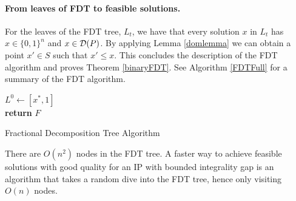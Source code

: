 	\paragraph{From leaves of FDT to feasible solutions.}
	For the leaves of the FDT tree,  $L_t$, we have that every solution $x$ in $L_t$ has $x\in\{0,1\}^n$ and $x\in \operatorname{\mathcal{D}}(P)$. By applying Lemma \ref{domlemma} we can obtain a point $x'\in S$ such that $x'\leq x$. This concludes the description of the FDT algorithm and proves Theorem \ref{binaryFDT}. See Algorithm \ref{FDTFull} for a summary of the FDT algorithm.
	
	\vspace*{8pt}
	
	
	\begin{algorithm}[H]\label{FDTFull}
		$L^0\leftarrow [x^*,1]$\\
		\textbf{return} $F$
		\caption{Fractional Decomposition Tree Algorithm}
	\end{algorithm}
	
	
\vspace{8pt}
There are $O(n^2)$ nodes in the FDT tree. A faster way to achieve feasible solutions with good quality for an IP with bounded integrality gap is an algorithm that takes a random dive into the FDT tree, hence only visiting $O(n)$ nodes. 

	
	\vspace*{8pt}
	
